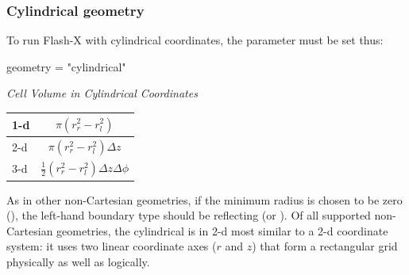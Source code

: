 
\subsubsection{Cylindrical geometry}

To run Flash-X with
cylindrical coordinates, the  parameter must be set
thus:

\begin{codeseg}
   geometry = "cylindrical"
\end{codeseg}



\vspace{1cm}

\begin{minipage}{6in}
\renewcommand{\arraystretch}{1.5}
\begin{center}
{\it Cell Volume in Cylindrical Coordinates}%
\begin{tabular}{|l|c|}
\hline
1-d & $\pi (r_r^2 - r_l^2)$ \\
\hline
2-d & $\pi (r_r^2 - r_l^2) \Delta z$ \\
\hline
3-d & $\frac{1}{2} (r_r^2 - r_l^2) \Delta z \Delta \phi$ \\
\hline
\end{tabular}
\end{center}
\end{minipage}
%

As in other non-Cartesian
geometries, if the minimum radius is chosen to be zero
(), the left-hand boundary type should be reflecting
(or ).
Of all supported non-Cartesian geometries, the cylindrical is
in 2-d most similar to a 2-d coordinate system: it uses two
linear coordinate axes ($r$ and $z$) that form a rectangular
grid physically as well as logically.

